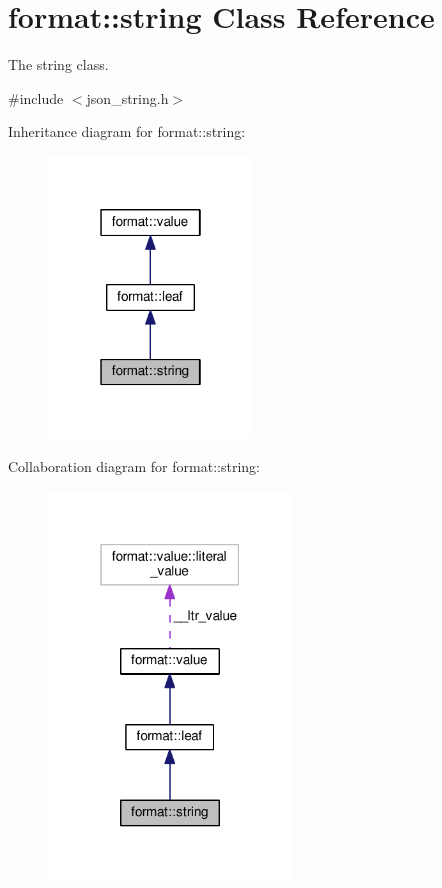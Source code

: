 \hypertarget{classformat_1_1string}{}\section{format\+:\+:string Class Reference}
\label{classformat_1_1string}


The string class.  




{\ttfamily \#include $<$json\+\_\+string.\+h$>$}



Inheritance diagram for format\+:\+:string\+:
\nopagebreak
\begin{figure}[H]
\begin{center}
\leavevmode
\includegraphics[width=154pt]{classformat_1_1string__inherit__graph}
\end{center}
\end{figure}


Collaboration diagram for format\+:\+:string\+:
\nopagebreak
\begin{figure}[H]
\begin{center}
\leavevmode
\includegraphics[width=183pt]{classformat_1_1string__coll__graph}
\end{center}
\end{figure}
